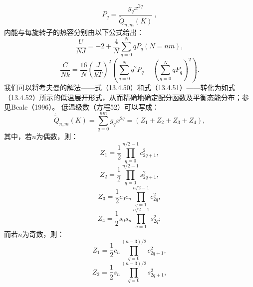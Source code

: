 \begin{equation}\tag{13.4.10}\label{eq:13.4.10}
P _ { q } = \frac { g _ { q } x ^{2 q} } { \tilde { Q } _ { n , m } ( K ) } \ ,
\end{equation}
内能与每旋转子的热容分别由以下公式给出：
\begin{equation}\tag{13.4.11}\label{eq:13.4.11}
\frac { U } { N J } = - 2 + \frac { 4 } { N } \sum _ { q = 0 } ^{N} q P _ { q }  ( N = n m ) ,
\end{equation}
\begin{equation}\tag{13.4.12}\label{eq:13.4.12}
\frac { C } { N k } = \frac { 16 } { N } \left( \frac { J } { k T } \right) ^{2} \left( \sum _ { q = 0 } ^{N} q ^{2} P _ { q } - \left( \sum _ { q = 0 } ^{N} q P _ { q } \right) ^{2} \right) .
\end{equation}
我们可以将考夫曼的解法——式（13.4.50）和式（13.4.51）——转化为如式（13.4.52）所示的低温展开形式，从而精确地确定配分函数及平衡态能分布；参见Beale（1996）。
低温级数（方程52）可以写成：
\begin{equation}\tag{13.4.13}\label{eq:13.4.13}
\dot { \tilde { Q } } _ { n , m } ( K ) = \sum _ { q = 0 } ^{n m} g _ { q } x ^{2 q} = ( Z _ { 1 } + Z _ { 2 } + Z _ { 3 } + Z _ { 4 } ) ,
\end{equation}
其中，若\(n\)为偶数，则：
\begin{equation}\tag{13.4.14}\label{eq:13.4.14}
Z _ { 1 } = \frac { 1 } { 2 } \prod _ { q = 0 } ^{n / 2 - 1} c _ { 2 q + 1 } ^{2} ,
\end{equation}
\begin{equation}\tag{13.4.15}\label{eq:13.4.15}
Z _ { 2 } = \frac { 1 } { 2 } \prod _ { q = 0 } ^{n / 2 - 1} s _ { 2 q + 1 } ^{2} ,
\end{equation}
\begin{equation}\tag{13.4.16}\label{eq:13.4.16}
Z _ { 3 } = \frac { 1 } { 2 } c _ { 0 } c _ { n } \prod _ { q = 1 } ^{n / 2 - 1} c _ { 2 q } ^{2} ,
\end{equation}
\begin{equation}\tag{13.4.17}\label{eq:13.4.17}
Z _ { 4 } = \frac { 1 } { 2 } s _ { 0 } s _ { n } \prod _ { q = 1 } ^{n / 2 - 1} s _ { 2 q } ^{2} ;
\end{equation}
而若\(n\)为奇数，则：
\begin{equation}\tag{13.4.18}\label{eq:13.4.18}
Z _ { 1 } = \frac { 1 } { 2 } c _ { n } \prod _ { q = 0 } ^{( n - 3 ) / 2} c _ { 2 q + 1 } ^{2} ,
\end{equation}
\begin{equation}\tag{13.4.19}\label{eq:13.4.19}
Z _ { 2 } = \frac { 1 } { 2 } s _ { n } \prod _ { q = 0 } ^{( n - 3 ) / 2} s _ { 2 q + 1 } ^{2} ,
\end{equation}
